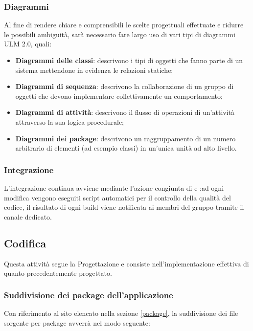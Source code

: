 \subsubsection{Diagrammi}
Al fine di rendere chiare e comprensibili le scelte progettuali effettuate e ridurre le possibili ambiguità, sarà necessario fare largo uso di vari tipi di diagrammi ULM 2.0, quali:
\begin{itemize}
	\item \textbf{Diagrammi delle classi}: descrivono i tipi di oggetti che fanno parte di un sistema mettendone in evidenza le relazioni statiche;
	\item \textbf{Diagrammi di sequenza}: descrivono la collaborazione di un gruppo di oggetti che devono implementare collettivamente un comportamento;
	\item \textbf{Diagrammi di attività}: descrivono il flusso di operazioni di un'attività attraverso la sua logica procedurale;
	\item \textbf{Diagrammi dei package}: descrivono un raggruppamento di un numero arbitrario di elementi (ad esempio classi) in un'unica unità ad alto livello.
\end{itemize}
\subsubsection{Integrazione}
L'integrazione continua avviene mediante l'azione congiunta di  e :ad ogni modifica vengono eseguiti script automatici per il controllo della qualità del codice, il risultato di ogni build viene notificata ai membri del gruppo tramite il canale  dedicato.

\subsection{Codifica}
Questa attività segue la Progettazione e consiste nell'implementazione effettiva di quanto precedentemente progettato.
\subsubsection{Suddivisione dei package dell'applicazione}
Con riferimento al sito elencato nella sezione \ref{package}, la suddivisione dei file sorgente per package avverrà nel modo seguente:

